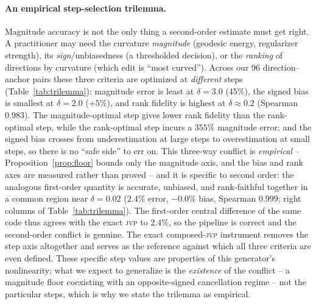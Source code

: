 \documentclass[10pt]{article}
\newcommand{\jvp}{\textsc{jvp}}
\begin{document}
\paragraph{An empirical step-selection trilemma.} Magnitude accuracy is not the only thing a
second-order estimate must get right. A practitioner may need the curvature \emph{magnitude} (geodesic
energy, regularizer strength), its \emph{sign}/unbiasedness (a thresholded decision), or the
\emph{ranking} of directions by curvature (which edit is ``most curved''). Across our $96$
direction--anchor pairs these three criteria are optimized at \emph{different} steps
(Table~\ref{tab:trilemma}): magnitude error is least at $\delta=3.0$ ($45\%$), the signed bias is
smallest at $\delta=2.0$ ($+5\%$), and rank fidelity is highest at $\delta\approx0.2$ (Spearman $0.983$).
The magnitude-optimal step gives lower rank fidelity than the rank-optimal step, while the rank-optimal
step incurs a $355\%$ magnitude error; and the signed bias crosses from underestimation at large steps to
overestimation at small steps, so there is no ``safe side'' to err on. This three-way conflict is
\emph{empirical} -- Proposition~\ref{prop:floor} bounds only the magnitude axis, and the bias and rank
axes are measured rather than proved -- and it is specific to second order: the analogous first-order
quantity is accurate, unbiased, and rank-faithful together in a common region near $\delta=0.02$ ($2.4\%$
error, $-0.0\%$ bias, Spearman $0.999$; right columns of Table~\ref{tab:trilemma}). The first-order
central difference of the same code thus agrees with the exact \jvp{} to $2.4\%$, so the pipeline is
correct and the second-order conflict is genuine. The exact composed-\jvp{} instrument removes the step
axis altogether and serves as the reference against which all three criteria are even defined. These specific
step values are properties of this generator's nonlinearity; what we expect to generalize is the
\emph{existence} of the conflict -- a magnitude floor coexisting with an opposite-signed cancellation
regime -- not the particular steps, which is why we state the trilemma as empirical.
\end{document}
